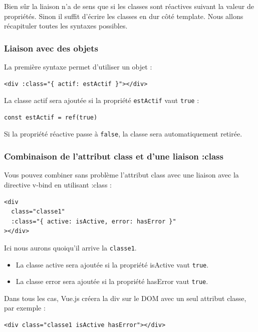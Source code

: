 \documentclass{article}
\begin{document}
Bien sûr la liaison n'a de sens que si les classes sont réactives suivant la valeur de propriétés. Sinon il suffit d'écrire les classes en dur côté {\color{monOrange}template}. Nous allons récapituler toutes les syntaxes possibles.

\subsubsection{Liaison avec des objets}
La première syntaxe permet d'utiliser un objet :
\begin{verbatim}
<div :class="{ actif: estActif }"></div>
\end{verbatim}
La classe {\color{monOrange}actif} sera ajoutée si la propriété {\tt estActif} vaut {\tt true} :
\begin{verbatim}
const estActif = ref(true)
\end{verbatim}
Si la propriété réactive passe à {\tt false}, la classe sera automatiquement retirée.

\subsubsection{Combinaison de l'attribut {\color{monOrange}class} et d'une liaison {\color{monOrange}:class}}
Vous pouvez combiner sans problème l'attribut {\color{monOrange}class} avec une liaison avec la directive {\color{monOrange}v-bind} en utilisant {\color{monOrange}:class} :
\begin{verbatim}
<div
  class="classe1"
  :class="{ active: isActive, error: hasError }"
></div>
\end{verbatim}
Ici nous aurons quoiqu'il arrive la {\tt classe1}.
\begin{itemize}
\item La classe {\color{monOrange}active} sera ajoutée si la propriété {\color{monOrange}isActive} vaut {\tt true}.
\item La classe {\color{monOrange}error} sera ajoutée si la propriété {\color{monOrange}hasError} vaut {\tt true}.
\end{itemize}
Dans tous les cas, Vue.js créera la div sur le DOM avec un seul attribut classe, par exemple :
\begin{verbatim}
<div class="classe1 isActive hasError"></div>
\end{verbatim}
\end{document}
